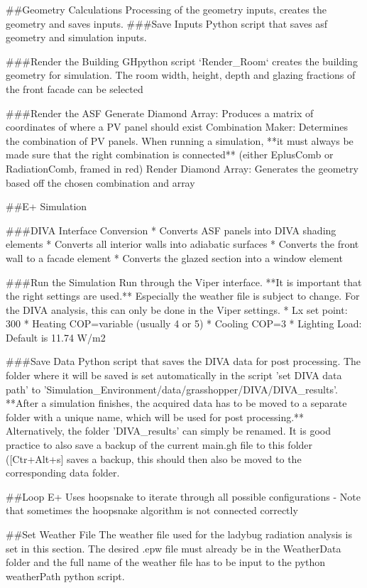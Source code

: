 	##Geometry Calculations
	Processing of the geometry inputs, creates the geometry and saves inputs.
	###Save Inputs
	Python script that saves asf geometry and simulation inputs.

	###Render the Building
	GHpython script `Render_Room` creates the building geometry for simulation. The room width, height, depth and glazing fractions of the front facade can be selected

	###Render the ASF
	Generate Diamond Array: Produces a matrix of coordinates of where a PV panel should exist
	Combination Maker: Determines the combination of PV panels. When running a simulation, **it must always be made sure that the right combination is connected** (either EplusComb or RadiationComb, framed in red)
	Render Diamond Array: Generates the geometry based off the chosen combination and array

	##E+ Simulation

	###DIVA Interface Conversion
	* Converts ASF panels into DIVA shading elements 
	* Converts all interior walls into adiabatic surfaces
	* Converts the front wall to a facade element
	* Converts the glazed section into a window element

	###Run the Simulation
	Run through the Viper interface. **It is important that the right settings are used.** Especially the weather file is subject to change. For the DIVA analysis, this can only be done in the Viper settings. 
	* Lx set point: 300
	* Heating COP=variable (usually 4 or 5)
	* Cooling COP=3
	* Lighting Load: Default is 11.74 W/m2

	###Save Data
	Python script that saves the DIVA data for post processing. The folder where it will be saved is set automatically in the script 'set DIVA data path' to 'Simulation_Environment/data/grasshopper/DIVA/DIVA_results'. **After a simulation finishes, the acquired data has to be moved to a separate folder with a unique name, which will be used for post processing.** Alternatively, the folder 'DIVA_results' can simply be renamed. It is good practice to also save a backup of the current main.gh file to this folder ([Ctr+Alt+s] saves a backup, this should then also be moved to the corresponding data folder. 

	##Loop E+
	Uses hoopsnake to iterate through all possible configurations
	 - Note that sometimes the hoopsnake algorithm is not connected correctly



	##Set Weather File
	The weather file used for the ladybug radiation analysis is set in this section. The desired .epw file must already be in the WeatherData folder and the full name of the weather file has to be input to the python weatherPath python script. 



